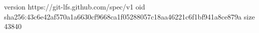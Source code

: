 version https://git-lfs.github.com/spec/v1
oid sha256:43c6e42af570a1a6630cf9668ca1f05288057c18aa46221c6f1bf941a8ce879a
size 43840
